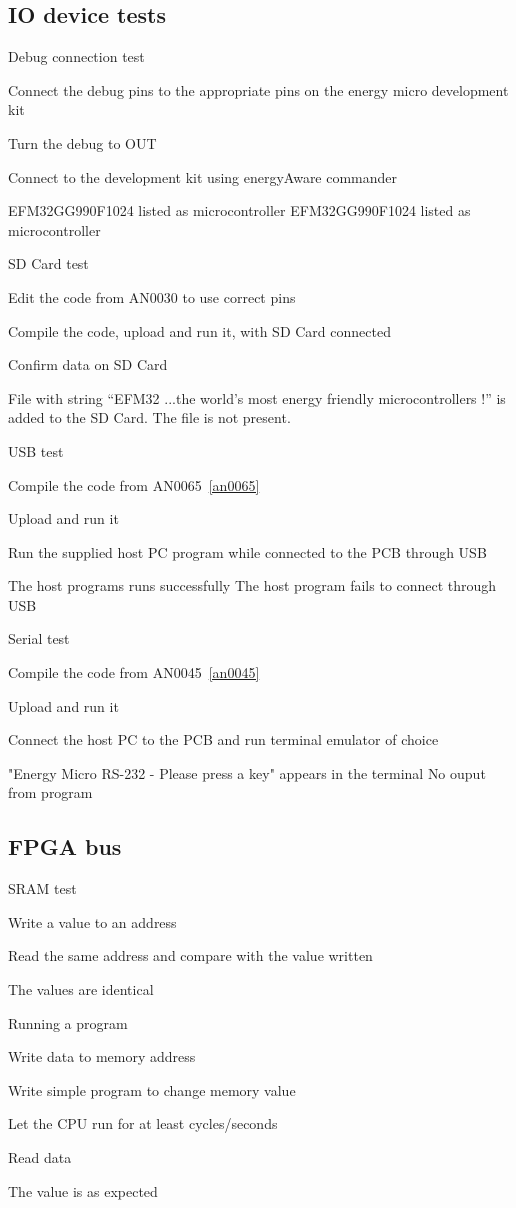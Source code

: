 \subsection{IO device tests}
\test
{Debug connection test}{
    \item{Connect the debug pins to the appropriate pins on the energy micro development kit}
    \item{Turn the debug to OUT}
    \item{Connect to the development kit using energyAware commander}
}{EFM32GG990F1024 listed as microcontroller}
{EFM32GG990F1024 listed as microcontroller}

\test
{SD Card test}{
    \item{Edit the code from AN0030 to use correct pins}
    \item{Compile the code, upload and run it, with SD Card connected}
    \item{Confirm data on SD Card}
}{File with string ``EFM32 ...the world's most energy friendly microcontrollers !'' is added to the SD Card.}
{The file is not present.}

\test
{USB test}{
    \item{Compile the code from AN0065~\ref{an0065}}
    \item{Upload and run it}
    \item{Run the supplied host PC program while connected to the PCB through USB}
}{The host programs runs successfully}
{The host program fails to connect through USB}

\test
{Serial test}{
    \item{Compile the code from AN0045~\ref{an0045}}
    \item{Upload and run it}
    \item{Connect the host PC to the PCB and run terminal emulator of choice}
}{"Energy Micro RS-232 - Please press a key" appears in the terminal}
{No ouput from program}


\subsection{FPGA bus}
\test
{SRAM test}{
    \item{Write a value to an address}
    \item{Read the same address and compare with the value written}
}{The values are identical}
{}

\test
{Running a program}{
    \item{Write data to memory address}
    \item{Write simple program to change memory value}
    \item{Let the CPU run for at least  cycles/seconds}
    \item{Read data}
}{The value is as expected}
{}
